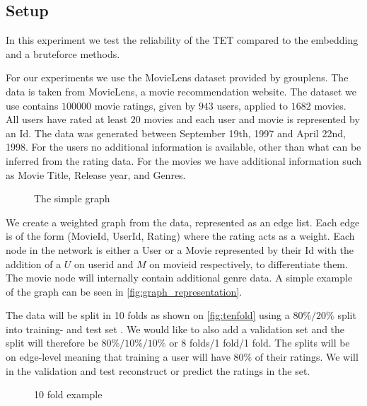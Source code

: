 \subsection{Setup}\label{Subsec:setup}
In this experiment we test the reliability of the TET compared to the embedding and a bruteforce methods. 

For our experiments we use the MovieLens dataset provided by grouplens\cite{Grouplensdata}.
The data is taken from MovieLens, a movie recommendation website. The dataset we use contains $100000$ movie ratings, given by $943$ users, applied to $1682$ movies.
All users have rated at least $20$ movies and each user and movie is represented by an Id.
The data was generated between September 19th, 1997 and April 22nd, 1998. For the users no additional information is available, other than what can be inferred from the rating data. For the movies we have additional information such as Movie Title, Release year, and Genres.

\begin{figure}[H]
	\centering
	\begin{adjustbox}{width=0.5\textwidth}
		
	\end{adjustbox}
	\caption{The simple graph}
	\label{fig:graph_representation}
\end{figure}

We create a weighted graph from the data, represented as an edge list.
Each edge is of the form (MovieId, UserId, Rating) where the rating acts as a weight.
Each node in the network is either a User or a Movie represented by their Id with the addition of a $U$ on userid and $M$ on movieid respectively, to differentiate them.
The movie node will internally contain additional genre data.
A simple example of the graph can be seen in \autoref{fig:graph_representation}.

The data will be split in 10 folds as shown on \autoref{fig:tenfold} using a $80\%/20\%$ split into training- and test set \cite{Ricci2015}.
We would like to also add a validation set and the split will therefore be $80\%/10\%/10\%$ or 8 folds/1 fold/1 fold.
The splits will be on edge-level meaning that training a user will have $80\%$ of their ratings.
We will in the validation and test reconstruct or predict the ratings in the set.

\begin{figure}[H]
	\centering
	\begin{adjustbox}{width=0.5\textwidth}
		
	\end{adjustbox}
	\caption{10 fold example}
	\label{fig:tenfold}
\end{figure}


